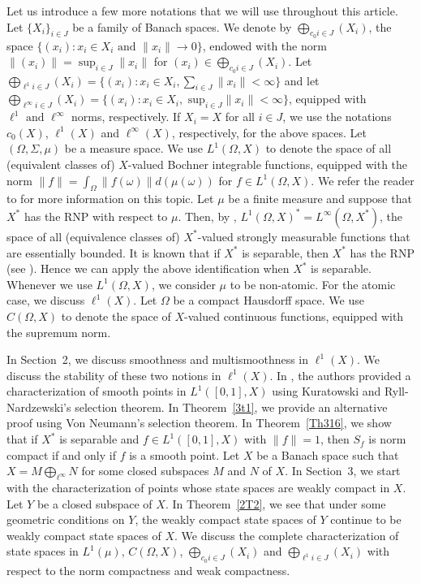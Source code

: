\documentclass[12pt]{amsart}
\theoremstyle{definition}
\numberwithin{equation}{section}
\begin{document}
Let us introduce a few more notations that we will use throughout this article. Let $\{X_i\}_{i\in J}$ be a family of Banach spaces. We denote by $\bigoplus_{{c_0}{i\in J}}(X_{i})$, the space $\{(x_i):x_{i}\in X_{i} \text{ and } \|x_i\|\to 0 \}$, endowed with the norm $\|(x_i)\|=\sup_{i\in {J}}\|x_i\|$  for $(x_i)\in \bigoplus_{{c_0}i\in J}(X_{i})$. Let $\bigoplus_{{\ell^{1}}{i\in J}} (X_i)=\{(x_i): x_i\in X_i, \sum_{i\in J}\|x_i\|<\infty\}$ and let $\bigoplus_{{\ell^{\infty}{i\in J}}} (X_i)=\{(x_i): x_i\in X_i,\text{ sup}_{i\in J}\|x_{i}\|<\infty\}$, equipped with $\ell^{1} \text{ and } \ell^{\infty}$ norms, respectively. If $X_i=X$ for all $i\in J$, we use the notations $c_{0}(X)$, $\ell^1(X)$ and $\ell^{\infty}(X)$, respectively, for the above spaces. Let $(\Omega, \Sigma, \mu)$ be a measure space. We use $L^1(\Omega,X)$ to denote the space of all (equivalent classes of) $X$-valued Bochner integrable functions, equipped with the norm $\|f\|=\int_{\Omega}\|f(\omega)\|d(\mu(\omega))$ for $f\in L^1(\Omega,X)$. We refer the reader to \cite{DU} for more information on this topic. Let $\mu$ be a finite measure and suppose that $X^*$ has the RNP with respect to $\mu$. Then, by \cite[Theorem~IV.1.1]{DU}, $L^1(\Omega,X)^*=L^{\infty}(\Omega,X^*)$, the space of all (equivalence classes of) $X^*$-valued strongly measurable functions that are essentially bounded. It is known that if $X^*$ is separable, then $X^*$ has the RNP (see \cite[Theorem~III.3.1]{DU}). Hence we can apply the above identification when $X^*$ is separable. Whenever we use $L^1(\Omega,X)$, we consider $\mu$ to be non-atomic. For the atomic case, we discuss $\ell^1(X)$. Let $\Omega$ be a compact Hausdorff space. We use $C(\Omega,X)$ to denote the space of $X$-valued continuous functions, equipped with the supremum norm. 

In Section~2, we discuss smoothness and multismoothness in $\ell^1(X)$. We discuss the stability of these two notions in $\ell^1(X)$. In \cite[Theorem~1.1]{DK}, the authors provided a characterization of smooth points in $L^1([0,1],X)$ using Kuratowski and Ryll-Nardzewski's selection theorem. In Theorem~\ref{3t1}, we provide an alternative proof using Von Neumann's selection theorem. In Theorem~\ref{Th316}, we show that if $X^*$ is separable and $f\in L^{1}([0,1],X)$ with $\|f\|=1$, then $S_f$ is norm compact if and only if $f$ is a smooth point. Let $X$ be a Banach space such that $X=M\bigoplus_{\ell^{\infty}}N$ for some closed subspaces $M$ and $N$ of $X$. In Section~3, we start with the characterization of points whose state spaces are weakly compact in $X$. Let $Y$ be a closed subspace of $X$. In Theorem~\ref{2T2}, we see that under some geometric conditions on $Y$, the weakly compact state spaces of $Y$ continue to be weakly compact state spaces of $X$. We discuss the complete characterization of state spaces in $L^1(\mu)$, $C(\Omega,X)$, $\bigoplus_{{c_{0}}{i\in J}}(X_{i})$ and $\bigoplus_{{\ell^1}{i\in J}}(X_{i})$ with respect to the norm compactness and weak compactness.
\end{document}
